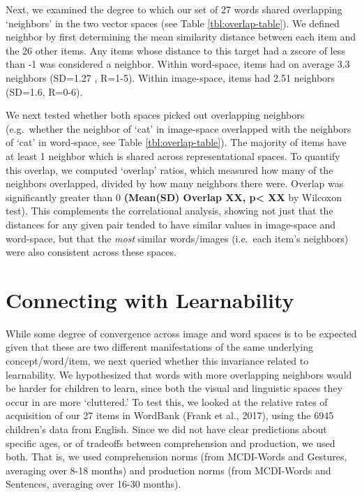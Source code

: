 \documentclass[10pt, letterpaper]{article}
\begin{document}
Next, we examined the degree to which our set of 27 words shared
overlapping `neighbors' in the two vector spaces (see Table
\ref{tbl:overlap-table}). We defined neighbor by first determining the
mean similarity distance between each item and the 26 other items. Any
items whose distance to this target had a zscore of less than -1 was
considered a neighbor. Within word-space, items had on average 3.3
neighbors (SD=1.27 , R=1-5). Within image-space, items had 2.51
neighbors (SD=1.6, R=0-6).

We next tested whether both spaces picked out overlapping neighbors
(e.g.~whether the neighbor of `cat' in image-space overlapped with the
neighbors of `cat' in word-space, see Table \ref{tbl:overlap-table}).
The majority of items have at least 1 neighbor which is shared across
representational spaces. To quantify this overlap, we computed `overlap'
ratios, which measured how many of the neighbors overlapped, divided by
how many neighbors there were. Overlap was significantly greater than 0
\textbf{(Mean(SD) Overlap XX, p\textless{} XX} by Wilcoxon test). This
complements the correlational analysis, showing not just that the
distances for any given pair tended to have similar values in
image-space and word-space, but that the \emph{most} similar
words/images (i.e.~each item's neighbors) were also consistent across
these spaces.

\section{Connecting with
Learnability}\label{connecting-with-learnability}

While some degree of convergence across image and word spaces is to be
expected given that these are two different manifestations of the same
underlying concept/word/item, we next queried whether this invariance
related to learnability. We hypothesized that words with more
overlapping neighbors would be harder for children to learn, since both
the visual and linguistic spaces they occur in are more `cluttered.' To
test this, we looked at the relative rates of acquisition of our 27
items in WordBank (Frank et al., 2017), using the 6945 children's data
from English. Since we did not have clear predictions about specific
ages, or of tradeoffs between comprehension and production, we used
both. That is, we used comprehension norms (from MCDI-Words and
Gestures, averaging over 8-18 months) and production norms (from
MCDI-Words and Sentences, averaging over 16-30 months).
\end{document}
